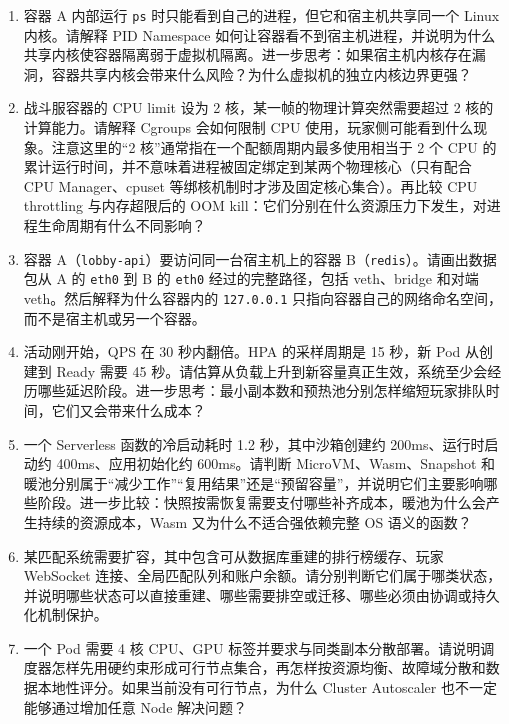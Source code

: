 \begin{tcolorbox}[breakable]
\begin{enumerate}
    \item 容器 A 内部运行 \texttt{ps} 时只能看到自己的进程，但它和宿主机共享同一个 Linux 内核。请解释 PID Namespace 如何让容器看不到宿主机进程，并说明为什么共享内核使容器隔离弱于虚拟机隔离。进一步思考：如果宿主机内核存在漏洞，容器共享内核会带来什么风险？为什么虚拟机的独立内核边界更强？

    \item 战斗服容器的 CPU limit 设为 2 核，某一帧的物理计算突然需要超过 2 核的计算能力。请解释 Cgroups 会如何限制 CPU 使用，玩家侧可能看到什么现象。注意这里的“2 核”通常指在一个配额周期内最多使用相当于 2 个 CPU 的累计运行时间，并不意味着进程被固定绑定到某两个物理核心（只有配合 CPU Manager、cpuset 等绑核机制时才涉及固定核心集合）。再比较 CPU throttling 与内存超限后的 OOM kill：它们分别在什么资源压力下发生，对进程生命周期有什么不同影响？

    \item 容器 A（\texttt{lobby-api}）要访问同一台宿主机上的容器 B（\texttt{redis}）。请画出数据包从 A 的 \texttt{eth0} 到 B 的 \texttt{eth0} 经过的完整路径，包括 veth、bridge 和对端 veth。然后解释为什么容器内的 \texttt{127.0.0.1} 只指向容器自己的网络命名空间，而不是宿主机或另一个容器。

    \item 活动刚开始，QPS 在 30 秒内翻倍。HPA 的采样周期是 15 秒，新 Pod 从创建到 Ready 需要 45 秒。请估算从负载上升到新容量真正生效，系统至少会经历哪些延迟阶段。进一步思考：最小副本数和预热池分别怎样缩短玩家排队时间，它们又会带来什么成本？

    \item 一个 Serverless 函数的冷启动耗时 1.2 秒，其中沙箱创建约 200ms、运行时启动约 400ms、应用初始化约 600ms。请判断 MicroVM、Wasm、Snapshot 和暖池分别属于“减少工作”“复用结果”还是“预留容量”，并说明它们主要影响哪些阶段。进一步比较：快照按需恢复需要支付哪些补齐成本，暖池为什么会产生持续的资源成本，Wasm 又为什么不适合强依赖完整 OS 语义的函数？

    \item 某匹配系统需要扩容，其中包含可从数据库重建的排行榜缓存、玩家 WebSocket 连接、全局匹配队列和账户余额。请分别判断它们属于哪类状态，并说明哪些状态可以直接重建、哪些需要排空或迁移、哪些必须由协调或持久化机制保护。

    \item 一个 Pod 需要 4 核 CPU、GPU 标签并要求与同类副本分散部署。请说明调度器怎样先用硬约束形成可行节点集合，再怎样按资源均衡、故障域分散和数据本地性评分。如果当前没有可行节点，为什么 Cluster Autoscaler 也不一定能够通过增加任意 Node 解决问题？


\end{enumerate}
\end{tcolorbox}
